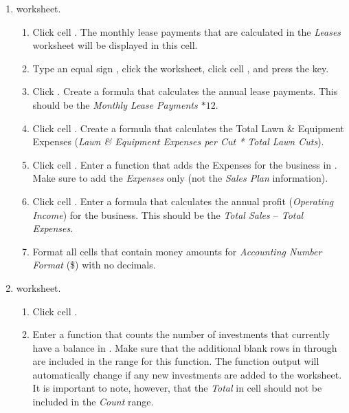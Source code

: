 \begin{enumbox}
\begin{enumerate}
\begin{enumerate}
		\end{enumerate}
	
		\item {} worksheet.
		
		\begin{enumerate}
			\item Click cell . The monthly lease payments that are calculated in the \textit{Leases} worksheet will be displayed in this cell.
			
			\item Type an equal sign \fmtTyping{=}, click the  worksheet, click cell , and press the  key.
			
			\item Click . Create a formula that calculates the annual lease payments. This should be the \textit{Monthly Lease Payments $ * 12 $}.
			
			\item Click cell . Create a formula that calculates the Total Lawn \& Equipment Expenses (\textit{Lawn \& Equipment Expenses per Cut * Total Lawn Cuts}).
			
			\item Click cell . Enter a  function that adds the Expenses for the business in . Make sure to add the \textit{Expenses} only (not the \textit{Sales Plan} information).
			
			\item Click cell . Enter a formula that calculates the annual profit (\textit{Operating Income}) for the business. This should be the \textit{Total Sales $ – $ Total Expenses}.
			
			\item Format all cells that contain money amounts for \textit{Accounting Number Format} (\$) with no decimals.
		\end{enumerate}
	
		\item {} worksheet.
		
		\begin{enumerate}
			\item Click cell . 
			
			\item Enter a  function that counts the number of investments that currently have a balance in . Make sure that the additional blank rows in  through  are included in the range for this function. The function output will automatically change if any new investments are added to the worksheet. It is important to note, however, that the \textit{Total} in cell  should not be included in the \textit{Count} range.
			

\end{enumerate}
\end{enumerate}
\end{enumbox}
